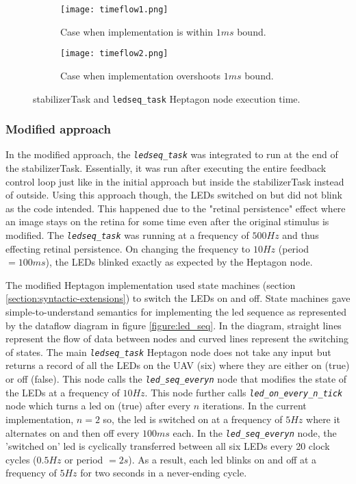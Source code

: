 \documentclass[10pt, a4paper]{article}
\newcommand{\textFunc}[1]{\texttt{\textit{#1}}}
\newcommand{\code}[1]{\texttt{#1}}
\begin{document}
    \begin{figure}[hbt!]
        \centering
        \begin{subfigure}[b]{0.98\textwidth}
            \centering
            \texttt{[image: timeflow1.png]}
            \caption{Case when implementation is within $1ms$ bound.}
            \label{figure:timeflow_reading1}
        \end{subfigure}
        \begin{subfigure}[b]{0.98\textwidth}
            \centering
            \texttt{[image: timeflow2.png]}
            \caption{Case when implementation overshoots $1ms$ bound.}
            \label{figure:timeflow_reading2}
        \end{subfigure}
        \caption{stabilizerTask and \code{ledseq\_task} Heptagon node execution time.}
        \label{figure:timeflow_readings}
    \end{figure}

    \subsubsection{Modified approach}
    In the modified approach, the \textFunc{ledseq\_task} was integrated to run at the end of the stabilizerTask. Essentially, it was run after executing the entire feedback control loop just like in the initial approach but inside the stabilizerTask instead of outside. Using this approach though, the LEDs switched on but did not blink as the code intended. This happened due to the "retinal persistence" effect where an image stays on the retina for some time even after the original stimulus is modified. The \textFunc{ledseq\_task} was running at a frequency of $500Hz$ and thus effecting retinal persistence. On changing the frequency to $10Hz$ (period $=100ms$), the LEDs blinked exactly as expected by the Heptagon node.

    The modified Heptagon implementation used state machines (section \ref{section:syntactic-extensions}) to switch the LEDs on and off. State machines gave simple-to-understand semantics for implementing the led sequence as represented by the dataflow diagram in figure \ref{figure:led_seq}. In the diagram, straight lines represent the flow of data between nodes and curved lines represent the switching of states. The main \textFunc{ledseq\_task} Heptagon node does not take any input but returns a record of all the LEDs on the UAV (six) where they are either on (true) or off (false). This node calls the \textFunc{led\_seq\_everyn} node that modifies the state of the LEDs at a frequency of $10Hz$. This node further calls \textFunc{led\_on\_every\_n\_tick} node which turns a led on (true) after every $n$ iterations. In the current implementation, $n=2$ so, the led is switched on at a frequency of $5Hz$ where it alternates on and then off every $100ms$ each. In the \textFunc{led\_seq\_everyn} node, the 'switched on' led is cyclically transferred between all six LEDs every 20 clock cycles ($0.5Hz$ or period $=2s$). As a result, each led blinks on and off at a frequency of $5Hz$ for two seconds in a never-ending cycle.
\end{document}
